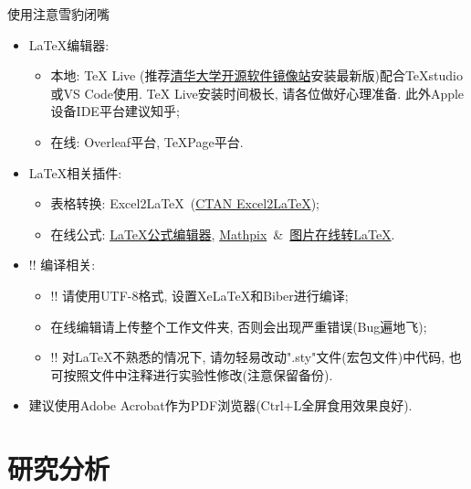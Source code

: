 \documentclass[hyperref, UTF8, CJK]{beamer}
\begin{document}
\begin{frame}{使用注意}{雪豹闭嘴}
	\begin{itemize}
		\item<1-> \LaTeX 编辑器:
		\begin{itemize}
			\item<1-> 本地: TeX Live (推荐\href{https://mirrors.tuna.tsinghua.edu.cn/CTAN/systems/texlive/Images/}{\color{scublue}清华大学开源软件镜像站}安装最新版)配合TeXstudio或VS Code使用. TeX Live安装时间极长, 请各位做好心理准备. 此外Apple设备IDE平台建议知乎;
			\item<1-> 在线: Overleaf平台, TeXPage平台.
		\end{itemize}
		\item<2-> \LaTeX 相关插件:
		\begin{itemize}
			\item<2-> 表格转换: Excel2\LaTeX~(\href{https://www.ctan.org/tex-archive/support/excel2latex/}{\color{scublue}CTAN Excel2\LaTeX});
			\item<2-> 在线公式: \href{https://www.latexlive.com/}{\color{scublue}LaTeX公式编辑器}, \href{https://mathpix.com/}{\color{scublue}
				Mathpix}~\&~\href{https://mathf.itewqq.cn/}{\color{scublue}图片在线转LaTeX}.
		\end{itemize}
		\item<3-> \color{scured}!! 编译相关:
		\begin{itemize}
			\item<3-> \alert{!! 请使用UTF-8格式, 设置XeLaTeX和Biber进行编译};
			\item<3-> 在线编辑请上传整个工作文件夹, 否则会出现严重错误(Bug遍地飞);
			\item<3-> \color{scured}!! 对\LaTeX 不熟悉的情况下, 请勿轻易改动".sty"文件(宏包文件)中代码, 也可按照文件中注释进行实验性修改(注意保留备份).
		\end{itemize}
		\item<4-> \color{scured} 建议使用Adobe Acrobat作为PDF浏览器(Ctrl+L全屏食用效果良好).
	\end{itemize}
\end{frame}

\section{研究分析}
\end{document}
